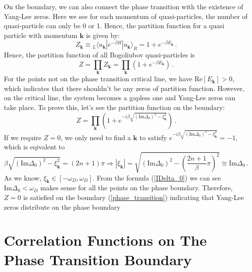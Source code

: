 \documentclass[aps,onecolumn,nofootinbib,superscriptaddress,notitlepage,longbibliography]{revtex4-1}
\begin{document}
On the boundary, we can also connect the phase transition with the
existence of Yang-Lee zeros. Here we see for each momentum of quasi-particles,
the number of quasi-particle can only be 0 or 1. Hence, the partition
function for a quasi particle with momentum $\bm{k}$ is given by:
\begin{equation}
Z_{\bm{k}}\equiv{}_{L}\langle u_{\bm{k}}|e^{-\beta H}|u_{\bm{k}}\rangle_{R}=1+e^{-\beta E_{\bm{k}}}\,.
\end{equation}
Hence, the partition function of all Bogoliubov quasi-particles is
\begin{equation}
Z=\prod_{\bm{k}}Z_{\bm{k}}=\prod_{\bm{k}}(1+e^{-\beta E_{\bm{k}}})\,.
\end{equation}
For the points not on the phase transition critical line, we have
$\text{Re}[E_{\bm{k}}]>0$, which indicates that there shouldn't be
any zeros of partition function. However, on the critical line, the
system becomes a gapless one and Yang-Lee zeros can take place. To
prove this, let's see the partition function on the boundary: 
\begin{equation}
Z=\prod_{\bm{k}}\left(1+e^{-i\beta\sqrt{\left(\text{Im}\Delta_{0}\right)^{2}-\xi_{\bm{k}}^{2}}}\right)\,.
\end{equation}
If we require $Z=0$, we only need to find a $\bm{k}$ to satisfy
$e^{-i\beta\sqrt{\left(\text{Im}\Delta_{0}\right)^{2}-\xi_{\bm{k}}^{2}}}=-1$,
which is eqivalent to 
\begin{equation}
\beta\sqrt{\left(\text{Im}\Delta_{0}\right)^{2}-\xi_{\bm{k}}^{2}}=(2n+1)\pi\Rightarrow|\xi_{\bm{k}}|=\sqrt{\left(\text{Im}\Delta_{0}\right)^{2}-\left(\frac{2n+1}{\beta}\pi\right)^{2}}\cong\text{Im}\Delta_{0}\,.
\end{equation}
As we know, $\xi_{\bm{k}}\in[-\omega_{D},\omega_{D}]$. From the formula
(\ref{IDelta_0}) we can see $\text{Im}\Delta_{0}<\omega_{D}$ makes
sense for all the points on the phase boundary. Therefore, $Z=0$
is satisfied on the boundary (\ref{phase_transition}) indicating
that Yang-Lee zeros distribute on the phase boundary

\section{Correlation Functions on The Phase Transition Boundary}
\end{document}

